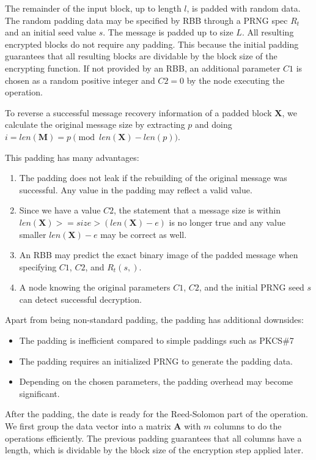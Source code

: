The remainder of the input block, up to length $l$, is padded with random data. The random padding data may be specified by RBB through a PRNG spec $R_t$ and an initial seed value $s$. The message is padded up to size $L$. All resulting encrypted blocks do not require any padding. This because the initial padding guarantees that all resulting blocks are dividable by the block size of the encrypting function. If not provided by an RBB, an additional parameter $C1$ is chosen as a random positive integer and $C2=0$  by the node executing the operation.

To reverse a successful message recovery information of a padded block $\mathbf{X}$, we calculate the original message size by extracting $p$ and doing $i=len(\mathbf{M})=p \pmod{ len\left(\mathbf{X}\right)-len\left(p\right) }$.

This padding has many advantages:
\begin{enumerate}
	\item The padding does not leak if the rebuilding of the original message was successful. Any value in the padding may reflect a valid value.
	\item Since we have a value $C2$, the statement that a message size is within $len(\mathbf{X})>=size>(len(\mathbf{X})-e)$ is no longer true and any value smaller $len(\mathbf{X})-e$ may be correct as well.
	\item An RBB may predict the exact binary image of the padded message when specifying $C1$, $C2$, and $R_{t}(s,)$.
	\item A node knowing the original parameters $C1$, $C2$, and the initial PRNG seed $s$ can detect successful decryption.
\end{enumerate}

Apart from being non-standard padding, the padding has additional downsides:
\begin{itemize}
	\item The padding is inefficient compared to simple paddings such as PKCS\#7
	\item The padding requires an initialized PRNG to generate the padding data.
	\item Depending on the chosen parameters, the padding overhead may become significant. 
\end{itemize}

After the padding, the date is ready for the Reed-Solomon part of the operation. We first group the data vector into a matrix $\mathbf{A}$ with $m$ columns to do the operations efficiently. The previous padding guarantees that all columns have a length, which is dividable by the block size of the encryption step applied later.

